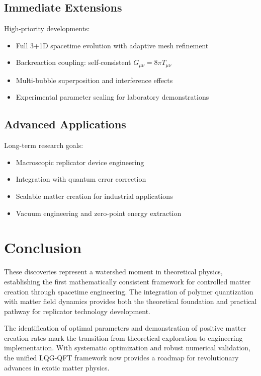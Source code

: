 \documentclass[11pt]{article}
\begin{document}
\subsection{Immediate Extensions}

High-priority developments:
\begin{itemize}
\item Full 3+1D spacetime evolution with adaptive mesh refinement
\item Backreaction coupling: self-consistent $G_{\mu\nu} = 8\pi T_{\mu\nu}$
\item Multi-bubble superposition and interference effects
\item Experimental parameter scaling for laboratory demonstrations
\end{itemize}

\subsection{Advanced Applications}

Long-term research goals:
\begin{itemize}
\item Macroscopic replicator device engineering
\item Integration with quantum error correction
\item Scalable matter creation for industrial applications
\item Vacuum engineering and zero-point energy extraction
\end{itemize}

\section{Conclusion}

These discoveries represent a watershed moment in theoretical physics, establishing the first mathematically consistent framework for controlled matter creation through spacetime engineering. The integration of polymer quantization with matter field dynamics provides both the theoretical foundation and practical pathway for replicator technology development.

The identification of optimal parameters and demonstration of positive matter creation rates mark the transition from theoretical exploration to engineering implementation. With systematic optimization and robust numerical validation, the unified LQG-QFT framework now provides a roadmap for revolutionary advances in exotic matter physics.
\end{document}
